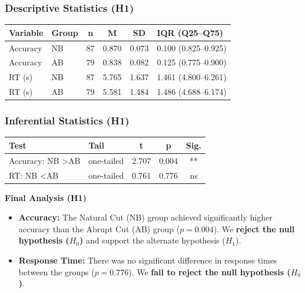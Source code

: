 \documentclass[10pt,a4paper]{article}
\begin{document}
\begin{minipage}{0.55\textwidth}
\subsubsection{Descriptive Statistics (H1)}
\begin{table}[H]
\centering\scriptsize
\begin{tabular}{l l c c c l}
\toprule
Variable & Group & n & M & SD & IQR (Q25–Q75) \\
\midrule
Accuracy & NB & 87 & 0.870 & 0.073 & 0.100 (0.825–0.925) \\
Accuracy & AB & 79 & 0.838 & 0.082 & 0.125 (0.775–0.900) \\
RT (s) & NB & 87 & 5.765 & 1.637 & 1.461 (4.800–6.261) \\
RT (s) & AB & 79 & 5.581 & 1.484 & 1.486 (4.688–6.174) \\
\bottomrule
\end{tabular}
\end{table}
\end{minipage}
\hfill
\begin{minipage}{0.4\textwidth}
\subsubsection{Inferential Statistics (H1)}
\begin{table}[H]
\centering\scriptsize
\begin{tabular}{l l c c c}
\toprule
Test & Tail & t & p & Sig. \\
\midrule
Accuracy: NB \textgreater AB & one-tailed & 2.707 & 0.004 & ** \\
RT: NB \textless AB & one-tailed & 0.761 & 0.776 & ns \\
\bottomrule
\end{tabular}
\end{table}
\end{minipage}

\textbf{Final Analysis (H1)}
\begin{itemize}
    \item \textbf{Accuracy:} The Natural Cut (NB) group achieved significantly higher accuracy than the Abrupt Cut (AB) group ($p = 0.004$). We \textbf{reject the null hypothesis ($H_0$)} and support the alternate hypothesis ($H_1$).
    \item \textbf{Response Time:} There was no significant difference in response times between the groups ($p = 0.776$). We \textbf{fail to reject the null hypothesis ($H_0$)}.
\end{itemize}
\end{document}
